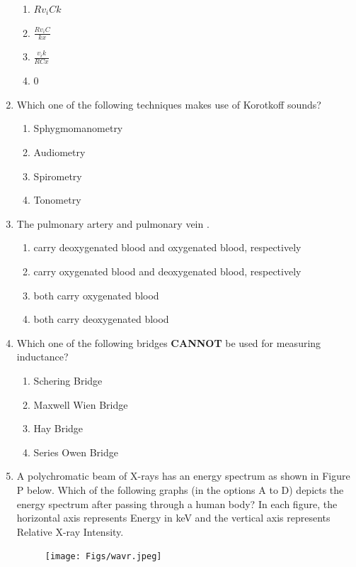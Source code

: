 \documentclass[journal]{IEEEtran}
\begin{document}
\begin{enumerate}
\begin{enumerate}
    \item \( Rv_i Ck \)
    \item \( \frac{Rv_i C}{kx} \)
    \item \( \frac{v_i k}{RCx} \)
    \item \(0\)
\end{enumerate}
\hfill{}

\item  Which one of the following techniques makes use of Korotkoff sounds?

\begin{enumerate}[label=(\Alph*)]
    \item Sphygmomanometry 
    \item Audiometry
    \item Spirometry
    \item Tonometry
\end{enumerate}
\hfill{}

\item  The pulmonary artery and pulmonary vein \underline{\hspace{3cm}}.
\begin{enumerate}[label=(\Alph*)]
    \item carry deoxygenated blood and oxygenated blood, respectively 
    \item carry oxygenated blood and deoxygenated blood, respectively
    \item both carry oxygenated blood
    \item both carry deoxygenated blood
\end{enumerate}
\hfill{}

\item  Which one of the following bridges \textbf{CANNOT} be used for measuring inductance?

\begin{enumerate}[label=(\Alph*)]
    \item Schering Bridge 
    \item Maxwell Wien Bridge
    \item Hay Bridge
    \item Series Owen Bridge
\end{enumerate}
\hfill{}


\item  A polychromatic beam of X-rays has an energy spectrum as shown in Figure P below. Which of the following graphs (in the options A to D) depicts the energy spectrum after passing through a human body? In each figure, the horizontal axis represents Energy in keV and the vertical axis represents Relative X-ray Intensity.
\begin{figure}[H]
\centering
\texttt{[image: Figs/wavr.jpeg]}
\caption{}
\end{figure}


\end{enumerate}
\end{document}
